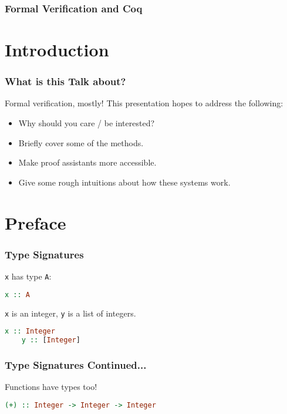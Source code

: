 \documentclass{beamer}
\author{
  Beck, Calvin\\
  \href{mailto:hobbes@ualberta.ca}{hobbes@ualberta.ca}
}
\begin{document}
\begin{frame}
  \frametitle{Formal Verification and Coq}
  \maketitle
\end{frame}

\section{Introduction}

\begin{frame}
  \frametitle{What is this Talk about?}

  Formal verification, mostly! This presentation hopes to address the following:

  \begin{itemize}
  \item Why should you care / be interested?
  \item Briefly cover some of the methods.
  \item Make proof assistants more accessible.
  \item Give some rough intuitions about how these systems work.
  \end{itemize}
\end{frame}

\section{Preface}

\begin{frame}[fragile]
  \frametitle{Type Signatures}

  \texttt{x} has type \texttt{A}:
  \begin{lstlisting}[frame=single, language=Haskell, breaklines=true]
    x :: A
  \end{lstlisting}

  \pause

  \texttt{x} is an integer, \texttt{y} is a list of integers.
  \begin{lstlisting}[frame=single, language=Haskell, breaklines=true]
    x :: Integer
    y :: [Integer]
  \end{lstlisting}

\end{frame}

\begin{frame}[fragile]
  \frametitle{Type Signatures Continued...}

  Functions have types too!

  \begin{lstlisting}[frame=single, language=Haskell, breaklines=true]
    (+) :: Integer -> Integer -> Integer
  \end{lstlisting}

\end{frame}
\end{document}
